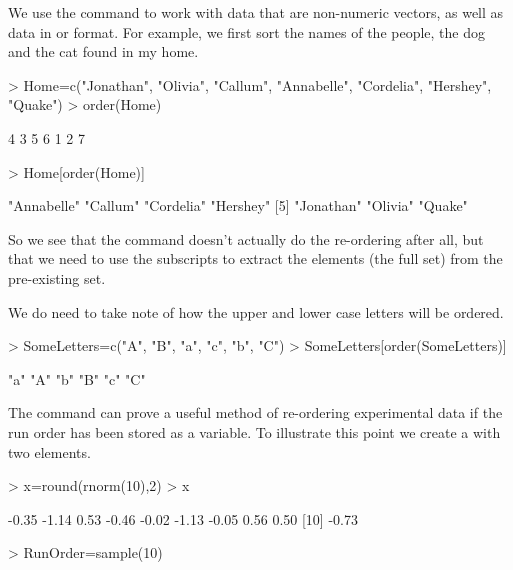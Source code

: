  
We use the  command to work with data that are non-numeric vectors, as well as data in  or  format. For example, we first sort the names of the people, the dog and the cat found in my home. 
\begin{Schunk}
\begin{Sinput}
> Home=c("Jonathan", "Olivia", "Callum", "Annabelle", "Cordelia", "Hershey", "Quake") 
> order(Home) 
\end{Sinput}
\begin{Soutput}
[1] 4 3 5 6 1 2 7
\end{Soutput}
\begin{Sinput}
> Home[order(Home)] 
\end{Sinput}
\begin{Soutput}
[1] "Annabelle" "Callum"    "Cordelia"  "Hershey"  
[5] "Jonathan"  "Olivia"    "Quake"    
\end{Soutput}
\end{Schunk}
 
So we see that the  command doesn't actually do the re-ordering after all, but that we need to use the subscripts to extract the elements (the full set) from the pre-existing set. 
 
We do need to take note of how the upper and lower case letters will be ordered. 
\begin{Schunk}
\begin{Sinput}
> SomeLetters=c("A", "B", "a", "c", "b", "C") 
> SomeLetters[order(SomeLetters)] 
\end{Sinput}
\begin{Soutput}
[1] "a" "A" "b" "B" "c" "C"
\end{Soutput}
\end{Schunk}
 
The  command can prove a useful method of re-ordering experimental data if the run order has been stored as a variable. To illustrate this point we create a  with two elements. 
\begin{Schunk}
\begin{Sinput}
> x=round(rnorm(10),2) 
> x 
\end{Sinput}
\begin{Soutput}
 [1] -0.35 -1.14  0.53 -0.46 -0.02 -1.13 -0.05  0.56  0.50
[10] -0.73
\end{Soutput}
\begin{Sinput}
> RunOrder=sample(10) 
\end{Sinput}
\end{Schunk}
 
